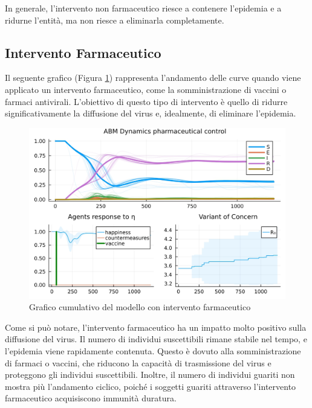 In generale, l'intervento non farmaceutico riesce a contenere 
l'epidemia e a ridurne l'entità, ma non riesce a eliminarla 
completamente.

\subsection{Intervento Farmaceutico}

Il seguente grafico (Figura \ref{fig:abm_pharm_intervent}) 
rappresenta l'andamento delle curve quando viene applicato un 
intervento farmaceutico, come la somministrazione di vaccini o 
farmaci antivirali. L'obiettivo di questo tipo di intervento è 
quello di ridurre significativamente la diffusione del virus e, 
idealmente, di eliminare l'epidemia.

\begin{figure}[H]
    \begin{center}
		\includegraphics[width=\textwidth]{img/SocialNetworkABM_VACCINE.jpg}
		\caption{Grafico cumulativo del modello con intervento farmaceutico}
		\label{fig:abm_pharm_intervent}
	\end{center}
\end{figure}

Come si può notare, l'intervento farmaceutico ha un impatto 
molto positivo sulla diffusione del virus. Il numero di individui 
suscettibili rimane stabile nel tempo, e l'epidemia viene rapidamente 
contenuta. Questo è dovuto alla somministrazione di farmaci o vaccini, 
che riducono la capacità di trasmissione del virus e proteggono gli 
individui suscettibili. Inoltre, il numero di individui guariti non 
mostra più l'andamento ciclico, poiché i soggetti guariti attraverso 
l'intervento farmaceutico acquisiscono immunità duratura.

